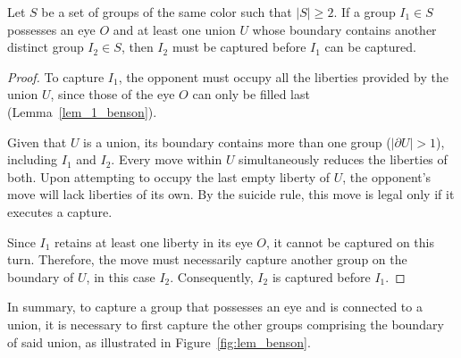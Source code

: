\begin{lemma}\label{lem_2_benson}
	Let \(S\) be a set of groups of the same color such that \(|S| \ge 2\). If a group \(I_1 \in S\) possesses an eye \(O\) and at least one union \(U\) whose boundary contains another distinct group \(I_2 \in S\), then \(I_2\) must be captured before \(I_1\) can be captured.
\end{lemma}

\begin{proof}
	To capture \(I_{1}\), the opponent must occupy all the liberties provided by the union \(U\), since those of the eye \(O\) can only be filled last (Lemma~\ref{lem_1_benson}).
	
	Given that \(U\) is a union, its boundary contains more than one group (\(|\partial U| > 1\)), including \(I_1\) and \(I_2\). Every move within \(U\) simultaneously reduces the liberties of both. Upon attempting to occupy the last empty liberty of \(U\), the opponent's move will lack liberties of its own. By the suicide rule, this move is legal only if it executes a capture.
	
	Since \(I_1\) retains at least one liberty in its eye \(O\), it cannot be captured on this turn. Therefore, the move must necessarily capture another group on the boundary of \(U\), in this case \(I_2\). Consequently, \(I_2\) is captured before \(I_1\).
\end{proof}
In summary, to capture a group that possesses an eye and is connected to a union, it is necessary to first capture the other groups comprising the boundary of said union, as illustrated in Figure~\ref{fig:lem_benson}.

